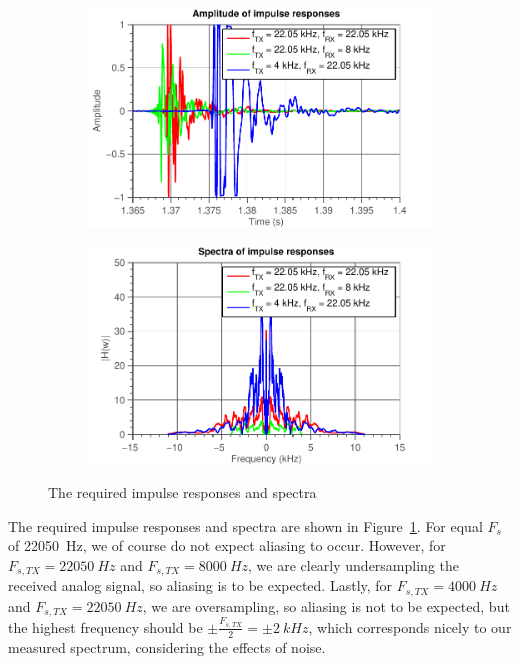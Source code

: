 \documentclass[11pt,titlepage]{report}
\begin{document}
\begin{figure}[H]
	\centering
	\begin{subfigure}{0.49\textwidth}
		\includegraphics[width=\textwidth]{resource/ass-1-report-11-time.pdf}
	\end{subfigure}
	\begin{subfigure}{0.49\textwidth}
		\includegraphics[width=\textwidth]{resource/ass-1-report-11.pdf}
	\end{subfigure}
	\caption{The required impulse responses and spectra}
	\label{fig:rep11-impulse-spectra}
\end{figure}

The required impulse responses and spectra are shown in Figure~\ref{fig:rep11-impulse-spectra}. For equal $F_s$ of \SI{22050}{Hz}, we of course do not expect aliasing to occur. However, for $F_{s,TX} = \SI{22050}{Hz}$ and $F_{s,TX} = \SI{8000}{Hz}$, we are clearly undersampling the received analog signal, so aliasing is to be expected. Lastly, for $F_{s,TX} = \SI{4000}{Hz}$ and $F_{s,TX} = \SI{22050}{Hz}$, we are oversampling, so aliasing is not to be expected, but the highest frequency should be $\pm \frac{F_{s,TX}}{2} = \pm \SI{2}{kHz}$, which corresponds nicely to our measured spectrum, considering the effects of noise.
\end{document}
